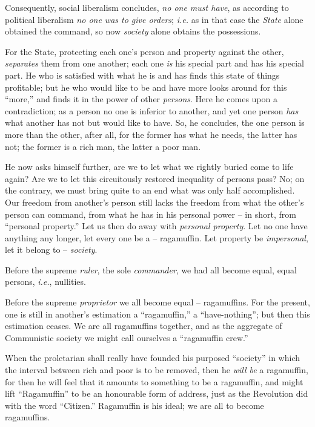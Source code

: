 \documentclass[12pt,a4paper]{book}
\begin{document}
Consequently, social liberalism concludes, \textit{no one must have}, as 
according to political liberalism \textit{no one was to give orders}; 
\textit{i.e.} as in that case the \textit{State} alone obtained the command, 
so now \textit{society} alone obtains the possessions.

For the State, protecting each one's person and property against the other, 
\textit{separates} them from one another; each one \textit{is} his special 
part and has his special part. He who is satisfied with what he is and has 
finds this state of things profitable; but he who would like to be and have 
more looks around for this ``more,'' and finds it in the power of other 
\textit{persons}. Here he comes upon a contradiction; as a person no one is 
inferior to another, and yet one person \textit{has} what another has not but 
would like to have. So, he concludes, the one person is more than the other, 
after all, for the former has what he needs, the latter has not; the former is 
a rich man, the latter a poor man.

He now asks himself further, are we to let what we rightly buried come to life 
again? Are we to let this circuitously restored inequality of persons pass? 
No; on the contrary, we must bring quite to an end what was only half 
accomplished. Our freedom from another's person still lacks the freedom from 
what the other's person can command, from what he has in his personal power -- 
in short, from ``personal property.'' Let us then do away with 
\textit{personal property}. Let no one have anything any longer, let every one 
be a -- ragamuffin. Let property be \textit{impersonal}, let it belong to -- 
\textit{society}.

Before the supreme \textit{ruler}, the sole \textit{commander}, we had all 
become equal, equal persons, \textit{i.e.}, nullities.

Before the supreme \textit{proprietor} we all become equal -- ragamuffins. For 
the present, one is still in another's estimation a ``ragamuffin,'' a 
``have-nothing''; but then this estimation ceases. We are all ragamuffins 
together, and as the aggregate of Communistic society we might call ourselves 
a ``ragamuffin crew.''

When the proletarian shall really have founded his purposed ``society'' in 
which the interval between rich and poor is to be removed, then he 
\textit{will be} a ragamuffin, for then he will feel that it amounts to 
something to be a ragamuffin, and might lift ``Ragamuffin'' to be an 
honourable form of address, just as the Revolution did with the word 
``Citizen.'' Ragamuffin is his ideal; we are all to become ragamuffins.
\end{document}
